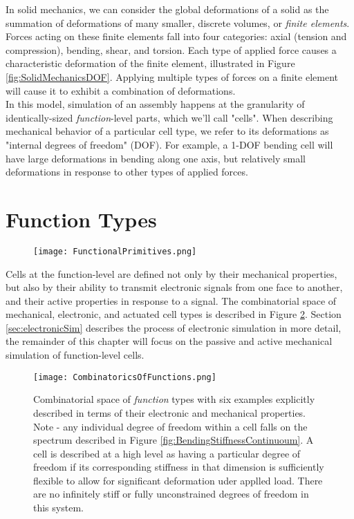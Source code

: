 {In solid mechanics, we can consider the global deformations of a solid as the summation of deformations of many smaller, discrete volumes, or \textit{finite elements}.  Forces acting on these finite elements fall into four categories: axial (tension and compression), bending, shear, and torsion.  Each type of applied force causes a characteristic deformation of the finite element, illustrated in Figure \ref{fig:SolidMechanicsDOF}.  Applying multiple types of forces on a finite element will cause it to exhibit a combination of deformations.\\

In this model, simulation of an assembly happens at the granularity of identically-sized \textit{function}-level parts, which we'll call "cells".  When describing mechanical behavior of a particular cell type, we refer to its deformations as "internal degrees of freedom" (DOF).  For example, a 1-DOF bending cell will have large deformations in bending along one axis, but relatively small deformations in response to other types of applied forces.\\

\section{Function Types}

\begin{figure}
  \texttt{[image: FunctionalPrimitives.png]}
  \caption{}
  \label{fig:FunctionalPrimitives}
\end{figure}


Cells at the function-level are defined not only by their mechanical properties, but also by their ability to transmit electronic signals from one face to another, and their active properties in response to a signal. The combinatorial space of mechanical, electronic, and actuated cell types is described in Figure \ref{fig:CombinatoricsOfFunctions}.  Section \ref{sec:electronicSim} describes the process of electronic simulation in more detail, the remainder of this chapter will focus on the passive and active mechanical simulation of function-level cells.
\\

\begin{figure}
  \texttt{[image: CombinatoricsOfFunctions.png]}
  \caption{Combinatorial space of \textit{function} types with six examples explicitly described in terms of their electronic and mechanical properties.  Note - any individual degree of freedom within a cell falls on the spectrum described in Figure \ref{fig:BendingStiffnessContinuoum}.  A cell is described at a high level as having a particular degree of freedom if its corresponding stiffness in that dimension is sufficiently flexible to allow for significant deformation uder applled load.  There are no infinitely stiff or fully unconstrained degrees of freedom in this system.}
  \label{fig:CombinatoricsOfFunctions}
\end{figure}

}
